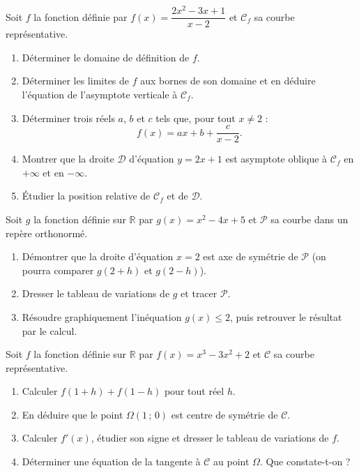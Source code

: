 \documentclass[11pt]{article}
\newcounter{popsec}
\newcounter{popsub}
\newcommand{\courssub}[1]{%
  \stepcounter{popsub}%
  \par\vspace{9pt}\noindent{\popxbold\fontsize{11.5}{13}\selectfont\color{popink}{\color{poporange}\thepopsec.\thepopsub}\hspace{6pt}#1}\par\nopagebreak\vspace{4pt}
}
\begin{document}
\courssub{Je m'entraîne}

\begin{exercice}
Soit $f$ la fonction définie par $f(x)=\dfrac{2x^2-3x+1}{x-2}$ et $\mathscr{C}_f$ sa courbe représentative.
\begin{enumerate}
\item Déterminer le domaine de définition de $f$.
\item Déterminer les limites de $f$ aux bornes de son domaine et en déduire l'équation de l'asymptote verticale à $\mathscr{C}_f$.
\item Déterminer trois réels $a$, $b$ et $c$ tels que, pour tout $x\neq 2$ :
\[ f(x)=ax+b+\frac{c}{x-2}. \]
\item Montrer que la droite $\mathscr{D}$ d'équation $y=2x+1$ est asymptote oblique à $\mathscr{C}_f$ en $+\infty$ et en $-\infty$.
\item Étudier la position relative de $\mathscr{C}_f$ et de $\mathscr{D}$.
\end{enumerate}
\end{exercice}

\begin{exercice}
Soit $g$ la fonction définie sur $\mathbb{R}$ par $g(x)=x^2-4x+5$ et $\mathscr{P}$ sa courbe dans un repère orthonormé.
\begin{enumerate}
\item Démontrer que la droite d'équation $x=2$ est axe de symétrie de $\mathscr{P}$ (on pourra comparer $g(2+h)$ et $g(2-h)$).
\item Dresser le tableau de variations de $g$ et tracer $\mathscr{P}$.
\item Résoudre graphiquement l'inéquation $g(x)\leq 2$, puis retrouver le résultat par le calcul.
\end{enumerate}
\end{exercice}

\begin{exercice}
Soit $f$ la fonction définie sur $\mathbb{R}$ par $f(x)=x^3-3x^2+2$ et $\mathscr{C}$ sa courbe représentative.
\begin{enumerate}
\item Calculer $f(1+h)+f(1-h)$ pour tout réel $h$.
\item En déduire que le point $\Omega(1\,;\,0)$ est centre de symétrie de $\mathscr{C}$.
\item Calculer $f'(x)$, étudier son signe et dresser le tableau de variations de $f$.
\item Déterminer une équation de la tangente à $\mathscr{C}$ au point $\Omega$. Que constate-t-on ?
\end{enumerate}
\end{exercice}
\end{document}
